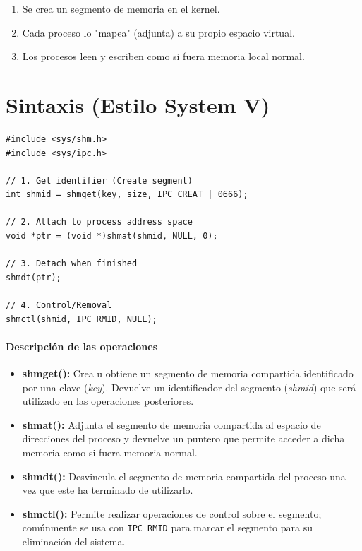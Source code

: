 \documentclass[12pt,a4paper]{article}
\begin{document}
\begin{enumerate}
    \item Se crea un segmento de memoria en el kernel.
    \item Cada proceso lo "mapea" (adjunta) a su propio espacio virtual.
    \item Los procesos leen y escriben como si fuera memoria local normal.
\end{enumerate}

\newpage

\section{Sintaxis (Estilo System V)}
\begin{lstlisting}[numbers=none]
#include <sys/shm.h>
#include <sys/ipc.h>

// 1. Get identifier (Create segment)
int shmid = shmget(key, size, IPC_CREAT | 0666);

// 2. Attach to process address space
void *ptr = (void *)shmat(shmid, NULL, 0);

// 3. Detach when finished
shmdt(ptr);

// 4. Control/Removal
shmctl(shmid, IPC_RMID, NULL);
\end{lstlisting}

\paragraph{Descripción de las operaciones}

\begin{itemize}
    \item \textbf{shmget():} Crea u obtiene un segmento de memoria compartida identificado por una clave (\textit{key}). Devuelve un identificador del segmento (\textit{shmid}) que será utilizado en las operaciones posteriores.

    \item \textbf{shmat():} Adjunta el segmento de memoria compartida al espacio de direcciones del proceso y devuelve un puntero que permite acceder a dicha memoria como si fuera memoria normal.

    \item \textbf{shmdt():} Desvincula el segmento de memoria compartida del proceso una vez que este ha terminado de utilizarlo.

    \item \textbf{shmctl():} Permite realizar operaciones de control sobre el segmento; comúnmente se usa con \texttt{IPC\_RMID} para marcar el segmento para su eliminación del sistema.
\end{itemize}
\end{document}
